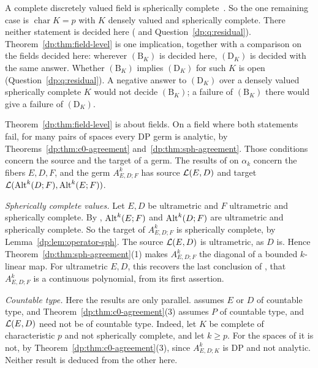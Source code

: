 A complete discretely valued field is spherically complete~\cite[Lemma~D.1]{I}. So the one remaining case is $\operatorname{char}K=p$ with $K$ densely valued and spherically complete. There neither statement is decided here (\cite[Section~12]{I} and Question~\ref{dp:q:residual}). Theorem~\ref{dp:thm:field-level} is one implication, together with a comparison on the fields decided here: wherever $(\mathrm B_K)$ is decided here, $(\mathrm D_K)$ is decided with the same answer. Whether $(\mathrm B_K)$ implies $(\mathrm D_K)$ for such $K$ is open (Question~\ref{dp:q:residual}). A negative answer to $(\mathrm D_K)$ over a densely valued spherically complete $K$ would not decide $(\mathrm B_K)$; a failure of $(\mathrm B_K)$ there would give a failure of $(\mathrm D_K)$.

\begin{remark}\label{dp:rem:field-level-spaces}
Theorem~\ref{dp:thm:field-level} is about fields. On a field where both statements fail, for many pairs of spaces every DP germ is analytic, by Theorems~\ref{dp:thm:c0-agreement} and~\ref{dp:thm:sph-agreement}. Those conditions concern the source and the target of a germ. The results of \cite{I} on $\alpha_k$ concern the fibers $E,D,F$, and the germ $A^k_{E,D;F}$ has source $\mathcal L(E,D)$ and target $\mathcal L(\operatorname{Alt}^k(D;F),\operatorname{Alt}^k(E;F))$.

\emph{Spherically complete values.} Let $E,D$ be ultrametric and $F$ ultrametric and spherically complete. By \cite[Theorem~5.2]{I}, $\operatorname{Alt}^k(E;F)$ and $\operatorname{Alt}^k(D;F)$ are ultrametric and spherically complete. So the target of $A^k_{E,D;F}$ is spherically complete, by Lemma~\ref{dp:lem:operator-sph}. The source $\mathcal L(E,D)$ is ultrametric, as $D$ is. Hence Theorem~\ref{dp:thm:sph-agreement}(1) makes $A^k_{E,D;F}$ the diagonal of a bounded $k$\nobreakdash-linear map. For ultrametric $E,D$, this recovers the last conclusion of \cite[Theorem~5.2]{I}, that $A^k_{E,D;F}$ is a continuous polynomial, from its first assertion.

\emph{Countable type.} Here the results are only parallel. \cite[Corollary~10.5]{I} assumes $E$ or $D$ of countable type, and Theorem~\ref{dp:thm:c0-agreement}(3) assumes $P$ of countable type, and $\mathcal L(E,D)$ need not be of countable type. Indeed, let $K$ be complete of characteristic $p$ and not spherically complete, and let $k\ge p$. For the spaces of \cite[Theorem~7.2(2)]{I} it is not, by Theorem~\ref{dp:thm:c0-agreement}(3), since $A^k_{E,D;K}$ is DP and not analytic. Neither result is deduced from the other here.
\end{remark}
